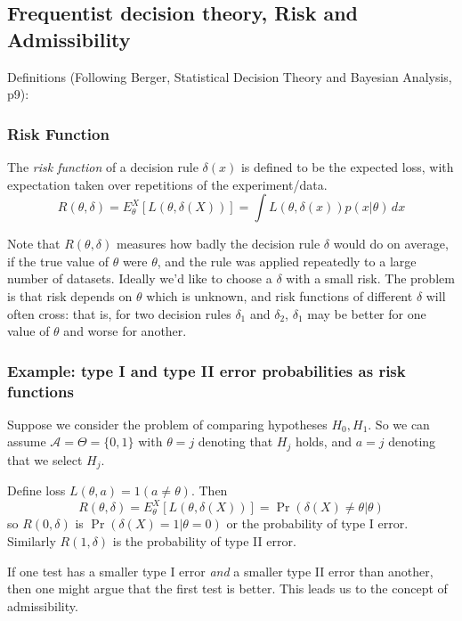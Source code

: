 \documentclass[12pt]{article}
\def\A{\mathcal A}
\begin{document}
\subsection{Frequentist decision theory, Risk and Admissibility}

Definitions (Following Berger, Statistical Decision Theory and Bayesian Analysis, p9):

\subsubsection{Risk Function}

The {\it risk function} of a decision rule $\delta(x)$ is defined to be the expected loss, with expectation taken over repetitions of the experiment/data.
\begin{equation}
R(\theta,\delta) = E_\theta^X[L(\theta,\delta(X))] = \int L(\theta,\delta(x)) p(x|\theta) \, dx 
\end{equation}

Note that $R(\theta,\delta)$ measures how badly the decision rule $\delta$ would do on average, if the true value of $\theta$ were $\theta$, and the rule
was applied repeatedly to a large number of datasets.
Ideally we'd like to choose a $\delta$ with a small risk. The problem is
that risk depends on $\theta$ which is unknown, and risk functions of different $\delta$ will often cross: that is, for two decision rules $\delta_1$ and $\delta_2$, $\delta_1$ may be better for one value of
$\theta$ and worse for another.

\subsubsection*{Example: type I and type II error probabilities as risk functions}

Suppose we consider the problem of comparing hypotheses $H_0,H_1$. 
So we can assume $\A= \Theta = \{0,1\}$ with $\theta=j$ denoting that $H_j$ holds,
and $a=j$ denoting that we select $H_j$.

Define loss $L(\theta,a) = 1(a \neq \theta)$. Then 
\begin{equation}
R(\theta,\delta) = E_\theta^X[L(\theta,\delta(X))] = \Pr(\delta(X) \neq \theta | \theta)
\end{equation}
so $R(0,\delta)$ is $\Pr(\delta(X) =1 | \theta=0)$ or the probability of type I error.
Similarly $R(1,\delta)$ is the probability of type II error.

If one test has a smaller type I error {\it and} a smaller type II error than another, then one might
argue that the first test is better. This leads us to the concept of admissibility.
\end{document}
